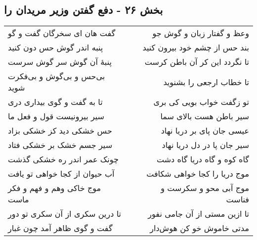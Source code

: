 \begin{center}
\section*{بخش ۲۶ - دفع گفتن وزیر مریدان را}
\label{sec:sh026}
\begin{longtable}{l p{0.5cm} r}
گفت هان ای سخرگان گفت و گو
&&
وعظ و گفتار زبان و گوش جو
\\
پنبه اندر گوش حس دون کنید
&&
بند حس از چشم خود بیرون کنید
\\
پنبهٔ آن گوش سر گوش سرست
&&
تا نگردد این کر آن باطن کرست
\\
بی‌حس و بی‌گوش و بی‌فکرت شوید
&&
تا خطاب ارجعی را بشنوید
\\
تا به گفت و گوی بیداری دری
&&
تو زگفت خواب بویی کی بری
\\
سیر بیرونیست قول و فعل ما
&&
سیر باطن هست بالای سما
\\
حس خشکی دید کز خشکی بزاد
&&
عیسی جان پای بر دریا نهاد
\\
سیر جسم خشک بر خشکی فتاد
&&
سیر جان پا در دل دریا نهاد
\\
چونک عمر اندر ره خشکی گذشت
&&
گاه کوه و گاه دریا گاه دشت
\\
آب حیوان از کجا خواهی تو یافت
&&
موج دریا را کجا خواهی شکافت
\\
موج خاکی وهم و فهم و فکر ماست
&&
موج آبی محو و سکرست و فناست
\\
تا درین سکری از آن سکری تو دور
&&
تا ازین مستی از آن جامی نفور
\\
گفت و گوی ظاهر آمد چون غبار
&&
مدتی خاموش خو کن هوش‌دار
\\
\end{longtable}
\end{center}
